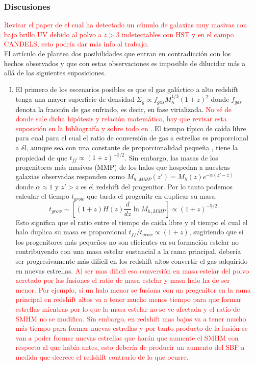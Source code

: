 \documentclass{article}
\begin{document}
\subsubsection*{Discusiones}
\textcolor{red}{Revisar el paper de \cite{wang2019dominant} el cual ha detectado un cúmulo de galaxías muy masivas con bajo brillo UV debido al polvo a $z>3$ indetectables con HST y en el campo CANDELS, esto podría dar más info al trabajo.}\\

El artículo de \cite{finkelstein2015increasing} plantea dos posibilidades que entran en contradicción con los hechos observados y que con estas observaciones es imposible de dilucidar más a allá de las siguientes suposiciones.

\begin{enumerate}[I) ]
\item El primero de los escenarios posibles es que el gas galáctico a alto redshift tenga una mayor superficie de densidad $\Sigma_g \propto f_{gas}M_h^{1/3}(1+z)^2$ donde $f_{gas}$ denota la fracción de gas enfriado, es decir, en fase virializada. \textcolor{red}{No sé de donde sale dicha hipótesis y relación matemática, hay que revisar esta suposición en la bibliografía y sobre todo en \cite{krumholz2011universal}.} El tiempo típico de caída libre para cual para el cual el ratio de conversión de gas a estrellas es proporcional a él, aunque sea con una constante de proporcionalidad pequeña \citep{krumholz2011universal}, tiene la propiedad de que $t_{ff}\propto (1+z)^{-3/2}$. Sin embargo, las masas de los progenitores más masivos (MMP) de los halos que hospedan a nuestras galaxias observadas responden como $M_{h,MMP}(z')=M_h(z)e^{-\alpha(z'-z)}$ donde $\alpha \approx 1$ y $z'>z$ es el redshift del progenitor. Por lo tanto podemos calcular el tiempo $t_{grow}$ que tarda el progenitr en duplicar su masa.
$$t_{grow}\sim \left[(1+z)H(z)\frac{d}{dz}\ln M_{h,MMP}\right]\propto (1+z)^{-5/2}$$
Esto significa que el ratio entre el tiempo de caida libre y el tiempo el cual el halo duplica su masa es proporcional $t_{ff}/t_{grow}\propto (1+z)$, sugiriendo que si los progenitores más pequeños no son eficientes en su formación estelar no contribuyendo con una masa estelar sustancial a la rama principal, debería ser progresivamente más difícil en los redshift altos convertir el gas adquirido en nuevas estrellas. \textcolor{red}{Al ser mas dificil esa conversión en masa estelar del polvo acretado por las fusiones el ratio de masa estelar y masa halo ha de ser menor. Por ejemplo, si un halo menor se fusiona con un progenitor en la rama principal en redshift altos va a tener mucho menos tiempo para que formar estrellas mientras por lo que la masa estelar no se ve afectada y el ratio de SMHM no se modifica. Sin embargo, en redshift mas bajos va a tener mucho más tiempo para formar nuevas estrellas y por tanto producto de la fusión se van a poder formar nuevas estrellas que harán que aumente el SMHM con respecto al que había antes, esto debería de producir un aumento del SBF a medida que decrece el redshift contrario de lo que ocurre.}


\end{enumerate}
\end{document}
